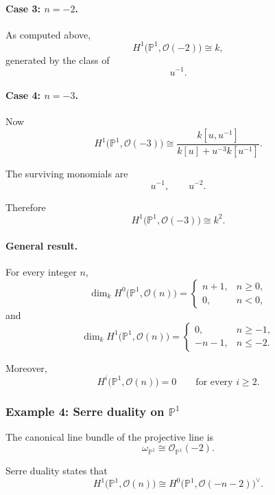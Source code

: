 \documentclass[12pt,a4paper]{article}
\theoremstyle{notespace}
\begin{document}
\paragraph{Case 3: \(n=-2\).}

As computed above,
\[
H^{1}\bigl(\mathbb{P}^{1},\mathcal{O}(-2)\bigr)
\cong
k,
\]
generated by the class of
\[
u^{-1}.
\]

\paragraph{Case 4: \(n=-3\).}

Now
\[
H^{1}\bigl(\mathbb{P}^{1},\mathcal{O}(-3)\bigr)
\cong
\frac{k[u,u^{-1}]}
{k[u]+u^{-3}k[u^{-1}]}.
\]

The surviving monomials are
\[
u^{-1},
\qquad
u^{-2}.
\]

Therefore
\[
H^{1}\bigl(\mathbb{P}^{1},\mathcal{O}(-3)\bigr)
\cong
k^{2}.
\]

\paragraph{General result.}

For every integer \(n\),
\[
\boxed{
	\dim_{k}H^{0}\bigl(\mathbb{P}^{1},\mathcal{O}(n)\bigr)
	=
	\begin{cases}
		n+1, & n\geq 0,\\
		0, & n<0,
	\end{cases}
}
\]
and
\[
\boxed{
	\dim_{k}H^{1}\bigl(\mathbb{P}^{1},\mathcal{O}(n)\bigr)
	=
	\begin{cases}
		0, & n\geq -1,\\
		-n-1, & n\leq -2.
	\end{cases}
}
\]

Moreover,
\[
H^{i}\bigl(\mathbb{P}^{1},\mathcal{O}(n)\bigr)=0
\qquad
\text{for every }i\geq 2.
\]

\subsubsection{Example 4: Serre duality on \texorpdfstring{\(\mathbb{P}^{1}\)}{P1}}

The canonical line bundle of the projective line is
\[
\omega_{\mathbb{P}^{1}}
\cong
\mathcal{O}_{\mathbb{P}^{1}}(-2).
\]

Serre duality states that
\[
H^{1}\bigl(\mathbb{P}^{1},\mathcal{O}(n)\bigr)
\cong
H^{0}\bigl(\mathbb{P}^{1},\mathcal{O}(-n-2)\bigr)^{\vee}.
\]
\end{document}
